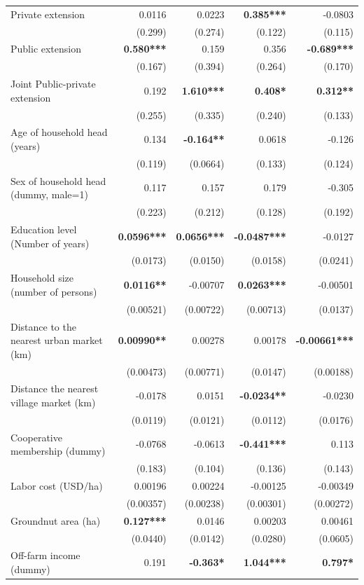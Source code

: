 \documentclass[
]{article}
\begin{document}
\begin{longtable}[t]{lrrrr}
\endfoot
\bottomrule
\endlastfoot
Private extension & 0.0116 & 0.0223 & \textbf{0.385***} & -0.0803\\
 & (0.299) & (0.274) & (0.122) & (0.115)\\
Public extension & \textbf{0.580***} & 0.159 & 0.356 & \textbf{-0.689***}\\
 & (0.167) & (0.394) & (0.264) & (0.170)\\
Joint Public-private extension & 0.192 & \textbf{1.610***} & \textbf{0.408*} & \textbf{0.312**}\\
 & (0.255) & (0.335) & (0.240) & (0.133)\\
Age of household head (years) & 0.134 & \textbf{-0.164**} & 0.0618 & -0.126\\
 & (0.119) & (0.0664) & (0.133) & (0.124)\\
Sex of household head (dummy, male=1) & 0.117 & 0.157 & 0.179 & -0.305\\
 & (0.223) & (0.212) & (0.128) & (0.192)\\
Education level (Number of years) & \textbf{0.0596***} & \textbf{0.0656***} & \textbf{-0.0487***} & -0.0127\\
 & (0.0173) & (0.0150) & (0.0158) & (0.0241)\\
Household size (number of persons) & \textbf{0.0116**} & -0.00707 & \textbf{0.0263***} & -0.00501\\
 & (0.00521) & (0.00722) & (0.00713) & (0.0137)\\
Distance to the nearest urban market (km) & \textbf{0.00990**} & 0.00278 & 0.00178 & \textbf{-0.00661***}\\
 & (0.00473) & (0.00771) & (0.0147) & (0.00188)\\
Distance the nearest village market (km) & -0.0178 & 0.0151 & \textbf{-0.0234**} & -0.0230\\
 & (0.0119) & (0.0121) & (0.0112) & (0.0176)\\
Cooperative membership (dummy) & -0.0768 & -0.0613 & \textbf{-0.441***} & 0.113\\
 & (0.183) & (0.104) & (0.136) & (0.143)\\
Labor cost (USD/ha) & 0.00196 & 0.00224 & -0.00125 & -0.00349\\
 & (0.00357) & (0.00238) & (0.00301) & (0.00272)\\
Groundnut area (ha) & \textbf{0.127***} & 0.0146 & 0.00203 & 0.00461\\
 & (0.0440) & (0.0142) & (0.0280) & (0.0605)\\
Off-farm income (dummy) & 0.191 & \textbf{-0.363*} & \textbf{1.044***} & \textbf{0.797*}\\

\end{longtable}
\end{document}
